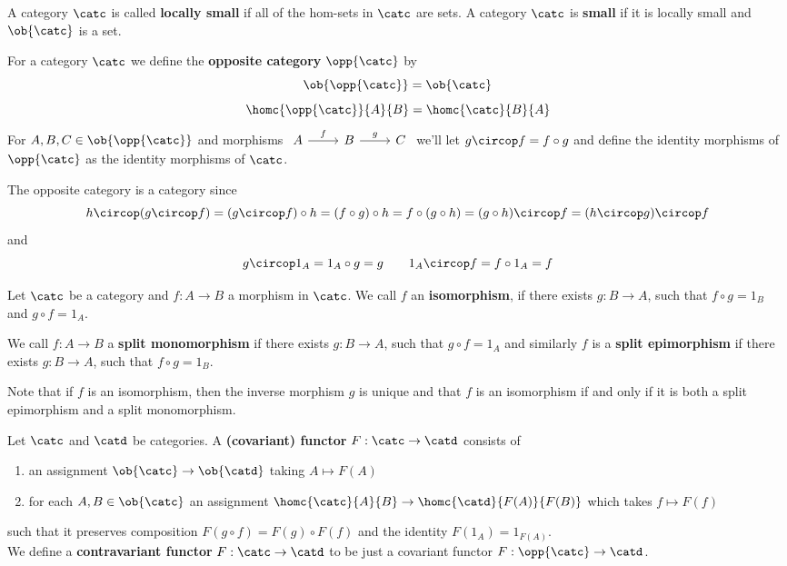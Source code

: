 \begin{definition}
    A category $\catc$ is called \textbf{locally small} if all of the hom-sets in $\catc$ are sets. 
    A category $\catc$ is \textbf{small} if it is locally small and $\ob{\catc}$ is a set.
\end{definition}
\begin{definition}
    For a category $\catc$ we define the \textbf{opposite category} $\opp{\catc}$ by
    \[\ob{\opp{\catc}} = \ob{\catc}\]
    \[\homc{\opp{\catc}}{A}{B} = \homc{\catc}{B}{A}\]
    For $A,B,C\in\ob{\opp{\catc}}$ and morphisms $\begin{tikzcd}
	A & B & C
	\arrow["f", from=1-1, to=1-2]
	\arrow["g", from=1-2, to=1-3]
\end{tikzcd}$ we'll let $g\circop f = f\circ g$ and define the identity morphisms of $\opp{\catc}$ as the identity morphisms of $\catc$.
\end{definition}
The opposite category is a category since 
\[
    h\circop (g\circop f) = (g\circop f) \circ h = (f \circ g) \circ h = f\circ (g\circ h) = (g\circ h)\circop f = (h\circop g)\circop f
\]
and 
\[
    g\circop 1_A = 1_A \circ g = g \hspace{20pt} 1_A\circop f = f\circ 1_A = f
\]
\begin{definition}
    Let $\catc$ be a category and $f: A\to B$ a morphism in $\catc$. We call $f$ an \textbf{isomorphism}, if
    there exists $g: B\to A$, such that $f\circ g = 1_B$ and $g\circ f = 1_A$.\par
    We call $f:A\to B$ a \textbf{split monomorphism} if there exists $g:B\to A$, such that
    $g\circ f = 1_A$ and similarly $f$ is a \textbf{split epimorphism} if there exists $g:B\to A$, such that
    $f\circ g = 1_B$.
\end{definition}
\begin{remark}
    Note that if $f$ is an isomorphism, then the inverse morphism $g$ is unique and that
    $f$ is an isomorphism if and only if it is both a split epimorphism and a split monomorphism.
\end{remark}
\begin{definition}
    Let $\catc$ and $\catd$ be categories. A \textbf{(covariant) functor} $F: \catc \to \catd$ consists of 
    \begin{enumerate}
        \item an assignment $\ob{\catc}\to\ob{\catd}$ taking $A \mapsto F(A)$
        \item for each $A,B\in\ob{\catc}$ an assignment $\homc{\catc}{A}{B}\to\homc{\catd}{F(A)}{F(B)}$ which takes $f \mapsto F(f)$
    \end{enumerate}
    such that it preserves composition $F(g\circ f) = F(g)\circ F(f)$ and the identity $F(1_A) = 1_{F(A)}$.\\ We define a \textbf{contravariant functor} $F:\catc \to \catd$ to 
    be just a covariant functor $F:\opp{\catc} \to \catd$.
\end{definition}
